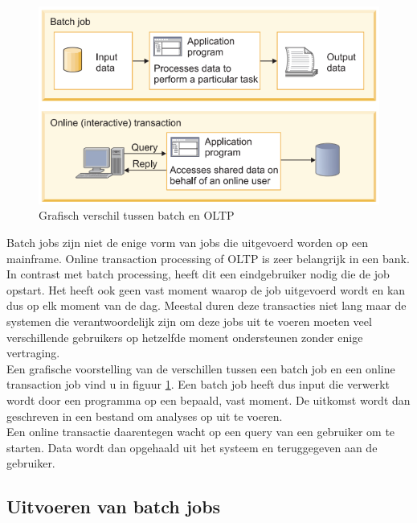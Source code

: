 \begin{figure}[ph!]
    \centering
    \includegraphics[width=400pt]{./graphics/BatchVSOnline.png}
    \caption{Grafisch verschil tussen batch en OLTP \autocite{IBMb}}
    \label{fig:online}
\end{figure}


Batch jobs zijn niet de enige vorm van jobs die uitgevoerd worden op een mainframe. Online transaction processing of OLTP is zeer belangrijk in een bank. In contrast met batch processing, heeft dit een eindgebruiker nodig die de job opstart. Het heeft ook geen vast moment waarop de job uitgevoerd wordt en kan dus op elk moment van de dag. Meestal duren deze transacties niet lang maar de systemen die verantwoordelijk zijn om deze jobs uit te voeren moeten veel verschillende gebruikers op hetzelfde moment ondersteunen zonder enige vertraging. \autocite{IBMb} \\

Een grafische voorstelling van de verschillen tussen een batch job en een online transaction job vind u in figuur \ref{fig:online}. Een batch job heeft dus input die verwerkt wordt door een programma op een bepaald, vast moment. De uitkomst wordt dan geschreven in een bestand om analyses op uit te voeren. \\
Een online transactie daarentegen wacht op een query van een gebruiker om te starten. Data wordt dan opgehaald uit het systeem en teruggegeven aan de gebruiker. \autocite{IBMb}


\subsection{Uitvoeren van batch jobs}

